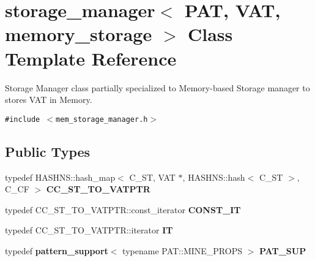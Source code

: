 \section{storage\_\-manager$<$ PAT, VAT, memory\_\-storage $>$ Class Template Reference}
\label{classstorage__manager_3_01PAT_00_01VAT_00_01memory__storage_01_4}
Storage Manager class partially specialized to Memory-based Storage manager to stores VAT in Memory.  


{\tt \#include $<$mem\_\-storage\_\-manager.h$>$}

\subsection*{Public Types}
\begin{CompactItemize}
\item 
typedef HASHNS::hash\_\-map$<$ C\_\-ST, VAT $\ast$, HASHNS::hash$<$ C\_\-ST $>$, C\_\-CF $>$ {\bf CC\_\-ST\_\-TO\_\-VATPTR}\label{classstorage__manager_3_01PAT_00_01VAT_00_01memory__storage_01_4_w0}

\item 
typedef CC\_\-ST\_\-TO\_\-VATPTR::const\_\-iterator {\bf CONST\_\-IT}\label{classstorage__manager_3_01PAT_00_01VAT_00_01memory__storage_01_4_w1}

\item 
typedef CC\_\-ST\_\-TO\_\-VATPTR::iterator {\bf IT}\label{classstorage__manager_3_01PAT_00_01VAT_00_01memory__storage_01_4_w2}

\item 
typedef {\bf pattern\_\-support}$<$ typename PAT::MINE\_\-PROPS $>$ {\bf PAT\_\-SUP}\label{classstorage__manager_3_01PAT_00_01VAT_00_01memory__storage_01_4_w3}

\end{CompactItemize}
